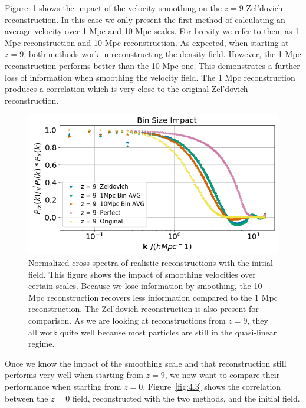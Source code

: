 Figure~\ref{fig:4.2} shows the impact of the velocity smoothing on the $z=9$ Zel'dovich reconstruction. In this case we only present the first method of calculating an average velocity over 1 Mpc and 10 Mpc scales. For brevity we refer to them as 1 Mpc reconstruction and 10 Mpc reconstruction. As expected, when starting at $z=9$, both methods work in reconstructing the density field. However, the 1 Mpc reconstruction performs better than the 10 Mpc one. This demonstrates a further loss of information when smoothing the velocity field. The 1 Mpc reconstruction produces a correlation which is very close to the original Zel'dovich reconstruction.

\begin{figure}
    \centering
    \includegraphics[width=1\columnwidth]{images/realRecon/binSize.png}%
    
    \caption{
    Normalized cross-spectra of realistic reconstructions with the initial field. This figure shows the impact of smoothing velocities over certain scales. Because we lose information by smoothing, the 10 Mpc reconstruction recovers less information compared to the 1 Mpc reconstruction. The Zel'dovich reconstruction is also present for comparison. As we are looking at reconstructions from $z=9$, they all work quite well because most particles are still in the quasi-linear regime.
    }
    
    \label{fig:4.2}
\end{figure}

Once we know the impact of the smoothing scale and that reconstruction still performs very well when starting from $z=9$, we now want to compare their performance when starting from $z=0$. Figure~\ref{fig:4.3} shows the correlation between the $z=0$ field, reconstructed with the two methods, and the initial field. 

